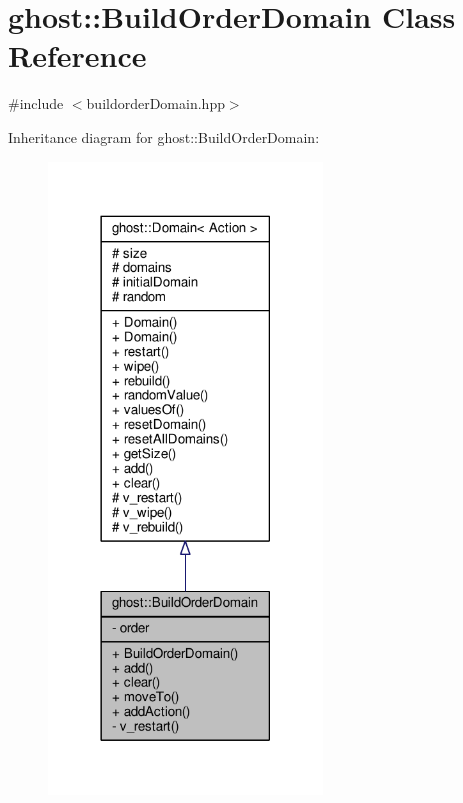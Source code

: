 \hypertarget{classghost_1_1BuildOrderDomain}{\section{ghost\-:\-:Build\-Order\-Domain Class Reference}
\label{classghost_1_1BuildOrderDomain}
}


{\ttfamily \#include $<$buildorder\-Domain.\-hpp$>$}



Inheritance diagram for ghost\-:\-:Build\-Order\-Domain\-:\nopagebreak
\begin{figure}[H]
\begin{center}
\leavevmode
\includegraphics[width=206pt]{classghost_1_1BuildOrderDomain__inherit__graph}
\end{center}
\end{figure}



